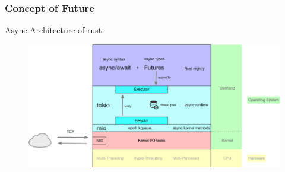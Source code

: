 \begin{frame}[fragile]
    \frametitle{Concept of Future}
    
    \centering
    Async Architecture of rust
    \begin{figure}
        \includegraphics[width=0.9\linewidth]{figs/rust-async-arch.png}
    \end{figure}
    
    
\end{frame}
